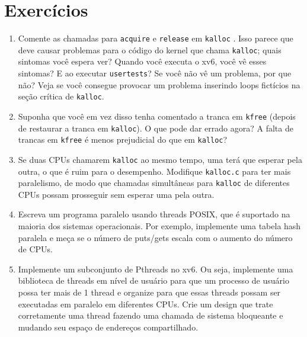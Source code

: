 \section{Exercícios}

\begin{enumerate}
  
\item Comente as chamadas para
\lstinline{acquire}
e
\lstinline{release}
em
\lstinline{kalloc}
.
Isso parece que deve causar problemas para
o código do kernel que chama
\lstinline{kalloc};
quais sintomas você espera ver?
Quando você executa o xv6, você vê esses sintomas?
E ao executar
\lstinline{usertests}?
Se você não vê um problema, por que não?
Veja se você consegue provocar um problema inserindo
loops fictícios na seção crítica de
\lstinline{kalloc}.

\item Suponha que você em vez disso tenha comentado a
tranca em
\lstinline{kfree} 
(depois de restaurar a tranca em
\lstinline{kalloc}).
O que pode dar errado agora? A falta de trancas em
\lstinline{kfree}
é menos prejudicial do que em
\lstinline{kalloc}?

\item Se duas CPUs chamarem
\lstinline{kalloc}
ao mesmo tempo, uma terá que esperar pela outra,
o que é ruim para o desempenho.
Modifique 
\lstinline{kalloc.c}
para ter mais paralelismo, de modo que chamadas simultâneas
para
\lstinline{kalloc}
de diferentes CPUs possam prosseguir sem esperar uma pela outra.

\item Escreva um programa paralelo usando threads POSIX, que é suportado na maioria
dos sistemas operacionais. Por exemplo, implemente uma tabela hash paralela e meça se
o número de puts/gets escala com o aumento do número de CPUs.

\item Implemente um subconjunto de Pthreads no xv6. Ou seja, implemente uma biblioteca de
threads em nível de usuário para que um processo de usuário possa ter mais de 1 thread e organize
para que essas threads possam ser executadas em paralelo em diferentes CPUs. Crie um
design que trate corretamente uma thread fazendo uma chamada de sistema bloqueante e
mudando seu espaço de endereços compartilhado.

\end{enumerate}

